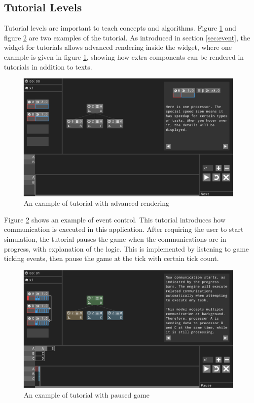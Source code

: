 \documentclass[msc,deptreport, cs]{infthesis}
\begin{document}
\subsection{Tutorial Levels}

Tutorial levels are important to teach concepts and algorithms. Figure \ref{fig:play4} and figure \ref{fig:play5} are two examples of the tutorial. As introduced in section \ref{sec:event}, the widget for tutorials allows advanced rendering inside the widget, where one example is given in figure \ref{fig:play4}, showing how extra components can be rendered in tutorials in addition to texts. 

\begin{figure}[!htb]
  \centering
  \includegraphics[width=\columnwidth]{play4.png}
  \caption{An example of tutorial with advanced rendering}
  \label{fig:play4}
\end{figure}

Figure \ref{fig:play5} shows an example of event control. This tutorial introduces how communication is executed in this application. After requiring the user to start simulation, the tutorial pauses the game when the communications are in progress, with explanation of the logic. This is implemented by listening to game ticking events, then pause the game at the tick with certain tick count.

\begin{figure}[!htb]
  \centering
  \includegraphics[width=\columnwidth]{play5.png}
  \caption{An example of tutorial with paused game}
  \label{fig:play5}
\end{figure}
\end{document}
